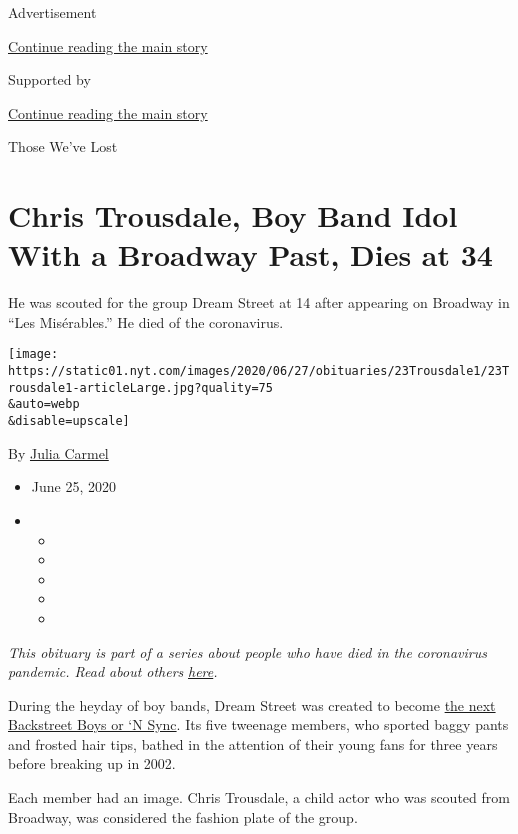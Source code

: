 Advertisement

\protect\hyperlink{after-top}{Continue reading the main story}

Supported by

\protect\hyperlink{after-sponsor}{Continue reading the main story}

Those We've Lost

\hypertarget{chris-trousdale-boy-band-idol-with-a-broadway-past-dies-at-34}{%
\section{Chris Trousdale, Boy Band Idol With a Broadway Past, Dies at
34}\label{chris-trousdale-boy-band-idol-with-a-broadway-past-dies-at-34}}

He was scouted for the group Dream Street at 14 after appearing on
Broadway in ``Les Misérables.'' He died of the coronavirus.

\texttt{[image: https://static01.nyt.com/images/2020/06/27/obituaries/23Trousdale1/23Trousdale1-articleLarge.jpg?quality=75\\\&auto=webp\\\&disable=upscale]}

By \href{https://www.nytimes.com/by/julia-carmel}{Julia Carmel}

\begin{itemize}
\item
  June 25, 2020
\item
  \begin{itemize}
  \item
  \item
  \item
  \item
  \item
  \end{itemize}
\end{itemize}

\emph{This obituary is part of a series about people who have died in
the coronavirus pandemic. Read about others}
\href{https://www.nytimes.com/interactive/2020/obituaries/people-died-coronavirus-obituaries.html}{\emph{here}}\emph{.}

During the heyday of boy bands, Dream Street was created to become
\href{https://www.nytimes.com/2004/10/24/nyregion/a-girl-singing-group-aims-for-the-stars.html}{the
next Backstreet Boys or `N Sync}. Its five tweenage members, who sported
baggy pants and frosted hair tips, bathed in the attention of their
young fans for three years before breaking up in 2002.

Each member had an image. Chris Trousdale, a child actor who was scouted
from Broadway, was considered the fashion plate of the group.

